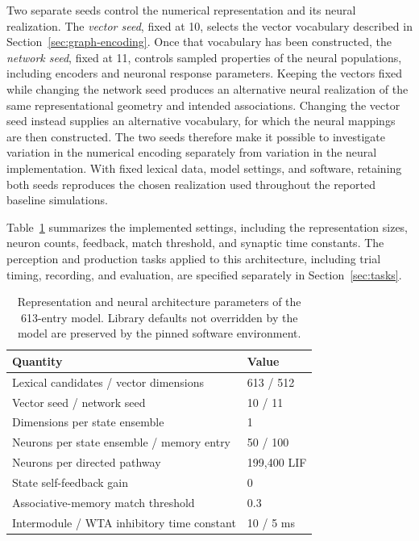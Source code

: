 Two separate seeds control the numerical representation and its neural realization. The \emph{vector seed}, fixed at 10, selects the vector vocabulary described in Section~\ref{sec:graph-encoding}. Once that vocabulary has been constructed, the \emph{network seed}, fixed at 11, controls sampled properties of the neural populations, including encoders and neuronal response parameters. Keeping the vectors fixed while changing the network seed produces an alternative neural realization of the same representational geometry and intended associations. Changing the vector seed instead supplies an alternative vocabulary, for which the neural mappings are then constructed. The two seeds therefore make it possible to investigate variation in the numerical encoding separately from variation in the neural implementation. With fixed lexical data, model settings, and software, retaining both seeds reproduces the chosen realization used throughout the reported baseline simulations.

Table~\ref{tab:parameters} summarizes the implemented settings, including the representation sizes, neuron counts, feedback, match threshold, and synaptic time constants. The perception and production tasks applied to this architecture, including trial timing, recording, and evaluation, are specified separately in Section~\ref{sec:tasks}.

\begin{table}[htbp]
\centering\small
\begin{tabular}{ll}\toprule
Quantity & Value\\\midrule
Lexical candidates / vector dimensions & 613 / 512\\
Vector seed / network seed & 10 / 11\\
Dimensions per state ensemble & 1\\
Neurons per state ensemble / memory entry & 50 / 100\\
Neurons per directed pathway & 199,400 LIF\\
State self-feedback gain & 0\\
Associative-memory match threshold & 0.3\\
Intermodule / WTA inhibitory time constant & 10 / 5 ms\\\bottomrule
\end{tabular}
\caption{Representation and neural architecture parameters of the 613-entry model. Library defaults not overridden by the model are preserved by the pinned software environment.}\label{tab:parameters}
\end{table}
\FloatBarrier

